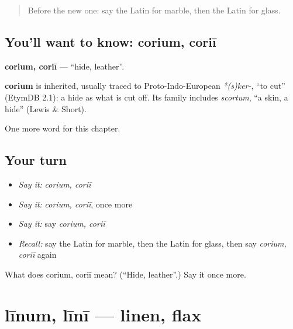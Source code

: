 \label{lesson:LA-C249-corium}



\begin{quote}
Before the new one: say the Latin for marble, then the Latin for glass.
\end{quote}

\subsection*{You'll want to know: corium, coriī}
\textbf{corium, coriī} — \textquotedblleft{}hide, leather\textquotedblright{}.

\begin{cousinweb}
\textbf{corium} is inherited, usually traced to Proto-Indo-European \emph{*(s)ker-}, \textquotedblleft{}to cut\textquotedblright{} (EtymDB 2.1): a hide as what is cut off. Its family includes \emph{scortum}, \textquotedblleft{}a skin, a hide\textquotedblright{} (Lewis \& Short).
\end{cousinweb}

\begin{grammarlens}[title={What you've built}]
One more word for this chapter.
\end{grammarlens}

\subsection*{Your turn}
\begin{itemize}
\raggedright
  \item \emph{Say it:} \emph{corium, coriī}
  \item \emph{Say it:} \emph{corium, coriī}, once more
  \item \emph{Say it:} say \emph{corium, coriī}
  \item \emph{Recall:} say the Latin for marble, then the Latin for glass, then say \emph{corium, coriī} again
\end{itemize}

\begin{tcolorbox}[breakable,colback=teal!4,colframe=teal!35!black,title={Before you move on}]
What does corium, coriī mean? (\textquotedblleft{}Hide, leather\textquotedblright{}.) Say it once more.
\end{tcolorbox}
\section[līnum, līnī]{līnum, līnī — linen, flax}

